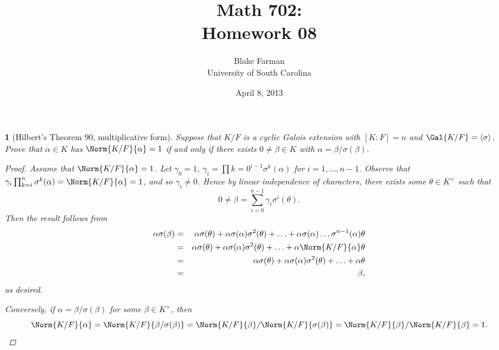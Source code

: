 \documentclass[10pt]{amsart}
\author{Blake Farman\\University of South Carolina}
\title{Math 702:\\Homework 08}
\date{April 8, 2013}
\begin{document}
\maketitle

\providecommand{\p}{\mathfrak{p}}
\providecommand{\m}{\mathfrak{m}}

\newtheorem{thm}{}
\newtheorem{lem}{Lemma}

\newcommand{\End}[2]{\operatorname{End}_{#1}\left(#2\right)}
\newcommand{\Hom}[2]{\operatorname{Hom}_{#1}\left(#2\right)}

\begin{thm}[Hilbert's Theorem 90, multiplicative form]
  Suppose that $K/F$ is a cyclic Galois extension with $[K : F] = n$ and $\Gal{K/F} = \left< \sigma \right>$.
  Prove that $\alpha \in K$ has $\Norm{K/F}{\alpha} = 1$ if and only if there exists $0 \neq \beta \in K$ with $\alpha = \beta / \sigma(\beta)$.
  \begin{proof}
    Assume that $\Norm{K/F}{\alpha} = 1$.
    Let $\gamma_0 = 1$, $\gamma_i = \prod{k=0}^{i-1}\sigma^k(\alpha)$ for $i = 1, \ldots, n-1$.
    Observe that $\gamma_i\prod_{k = i}^n \sigma^k(\alpha) = \Norm{K/F}{\alpha} = 1$, and so $\gamma_i \neq 0$.
    Hence by linear independence of characters, there exists some $\theta \in K^\times$ such that 
    $$0 \neq \beta = \sum_{i=0}^{n-1} \gamma_i \sigma^i(\theta).$$
    Then the result follows from
    \begin{eqnarray*}
      \alpha\sigma(\beta) &=& \alpha\sigma(\theta) + \alpha\sigma(\alpha)\sigma^2(\theta) + \ldots + \alpha\sigma(\alpha) \ldots \sigma^{n-1}(\alpha)\theta\\
      &=& \alpha\sigma(\theta) + \alpha\sigma(\alpha)\sigma^2(\theta) + \ldots + \alpha \Norm{K/F}{\alpha}\theta\\
      &=& \alpha\sigma(\theta) + \alpha\sigma(\alpha)\sigma^2(\theta) + \ldots + \alpha \theta\\
      &=& \beta,
    \end{eqnarray*}
    as desired.
    
    Conversely, if $\alpha = \beta/\sigma(\beta)$ for some $\beta \in K^\times$, then
    $$\Norm{K/F}{\alpha} = \Norm{K/F}{\beta/\sigma(\beta)} = \Norm{K/F}{\beta}/\Norm{K/F}{\sigma(\beta)} = \Norm{K/F}{\beta}/\Norm{K/F}{\beta} = 1.$$
  \end{proof}
\end{thm}
\end{document}
